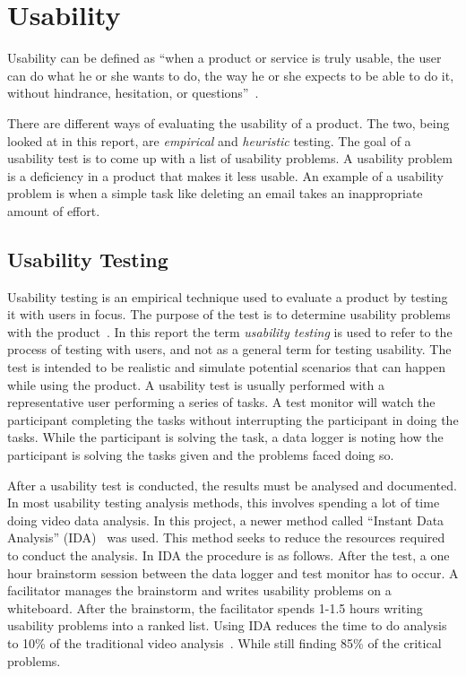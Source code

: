 \section{Usability}
\label{sub:usability}

Usability can be defined as \enquote{when a product or service is truly usable, the user can do what he or she wants to do, the way he or she expects to be able to do it, without hindrance, hesitation, or questions}~\cite{RubinChisnellSpool08}.

There are different ways of evaluating the usability of a product. The two, being looked at in this report, are \textit{empirical} and \textit{heuristic} testing. The goal of a usability test is to come up with a list of usability problems. A usability problem is a deficiency in a product that makes it less usable. An example of a usability problem is when a simple task like deleting an email takes an inappropriate amount of effort.

\subsection{Usability Testing}
\label{sub:usabilityTesting}
Usability testing is an empirical technique used to evaluate a product by testing it with users in focus. The purpose of the test is to determine usability problems with the product~\cite{RubinChisnellSpool08}. In this report the term \emph{usability testing} is used to refer to the process of testing with users, and not as a general term for testing usability. The test is intended to be realistic and simulate potential scenarios that can happen while using the product. A usability test is usually performed with a representative user performing a series of tasks. A test monitor will watch the participant completing the tasks without interrupting the participant in doing the tasks. While the participant is solving the task, a data logger is noting how the participant is solving the tasks given and the problems faced doing so.

After a usability test is conducted, the results must be analysed and documented. In most usability testing analysis methods, this involves spending a lot of time doing video data analysis. In this project, a newer method called \enquote{Instant Data Analysis} (IDA)~\cite{kjeldskov2004instant} was used. This method seeks to reduce the resources required to conduct the analysis. In IDA the procedure is as follows. After the test, a one hour brainstorm session between the data logger and test monitor has to occur. A facilitator manages the brainstorm and writes usability problems on a whiteboard. After the brainstorm, the facilitator spends 1-1.5 hours writing usability problems into a ranked list. Using IDA reduces the time to do analysis to 10\% of the traditional video analysis~\cite{kjeldskov2004instant}. While still finding 85\% of the critical problems.

